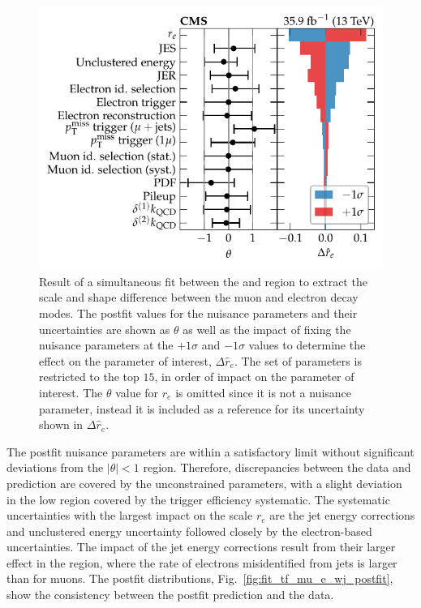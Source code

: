 \begin{figure}[htb]
    \centering
    \includegraphics{chapters/042_backgrounds/images/impacts_tfmu2ewj.pdf}
    \caption[Nuisance parameters from a simultaneous fit to the muon and electron control regions]{
        Result of a simultaneous fit between the \muplusjets and \eleplusjets region to extract the scale and shape difference between the muon and electron decay modes. The postfit values for the nuisance parameters and their uncertainties are shown as $\theta$ as well as the impact of fixing the nuisance parameters at the $+1\sigma$ and $-1\sigma$ values to determine the effect on the parameter of interest, $\Delta \hat{r}_e$. The set of parameters is restricted to the top $15$, in order of impact on the parameter of interest. The $\theta$ value for $r_e$ is omitted since it is not a nuisance parameter, instead it is included as a reference for its uncertainty shown in $\Delta \hat{r}_e$.
    }
    \label{fig:fit_tf_mu_e_wj_impacts}
\end{figure}
%
The postfit nuisance parameters are within a satisfactory limit without significant deviations from the $|\theta|<1$ region. Therefore, discrepancies between the data and prediction are covered by the unconstrained parameters, with a slight deviation in the low \recoil \muplusjets region covered by the \ptmiss trigger efficiency systematic. The systematic uncertainties with the largest impact on the scale $r_e$ are the jet energy corrections and unclustered energy uncertainty followed closely by the electron-based uncertainties. The impact of the jet energy corrections result from their larger effect in the \eleplusjets region, where the rate of electrons misidentified from jets is larger than for muons. The postfit distributions, Fig.~\ref{fig:fit_tf_mu_e_wj_postfit}, show the consistency between the postfit prediction and the data.
